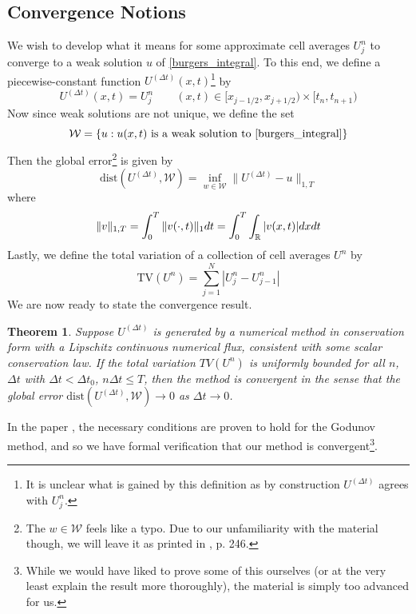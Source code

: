\documentclass{myproject}
\newtheorem{theorem}{Theorem}
\begin{document}
\subsection{Convergence Notions}

We wish to develop what it means for some approximate cell averages $U_j^n$ to converge to a weak solution $u$ of \eqref{burgers_integral}. To this end, we define a piecewise-constant function $U^{(\Delta t)}(x,t)$\footnote{It is unclear what is gained by this definition as by construction $U^{(\Delta t)}$ agrees with $U_j^n$.} by
\begin{equation}
    U^{(\Delta t)}(x,t) = U_j^n \qquad (x,t) \in [x_{j-1/2}, x_{j+1/2}) \times [t_n, t_{n+1})
\end{equation}
Now since weak solutions are not unique, we define the set
\begin{equation}
    \mathcal{W} = \{u : u(x,t) \text{ is a weak solution to \eqref{burgers_integral}}\}
\end{equation}
Then the global error\footnote{The $w \in \mathcal{W}$ feels like a typo. Due to our unfamiliarity with the material though, we will leave it as printed in \cite{leveque2002}, p. 246.} is given by
\begin{equation}
    \text{dist}\left(U^{(\Delta t)}, \mathcal{W}\right) = \inf_{w \in \mathcal{W}} \| U^{(\Delta t)} - u \|_{1,T}
\end{equation}
where 
\begin{equation}
    \|v\|_{1,T} = \int_{0}^{T} \|v(\cdot,t)\|_1dt = \int_{0}^{T}\int_{\operatorname{\mathbb{R}}}|v(x,t)|dx dt
\end{equation}
Lastly, we define the total variation of a collection of cell averages $U^n$ by 
\begin{equation}
    \text{TV}(U^n) = \sum_{j=1}^N |U_j^n - U_{j-1}^n|
\end{equation}
We are now ready to state the convergence result.
\begin{theorem}
    Suppose $U^{(\Delta t)}$ is generated by a numerical method in conservation form with a Lipschitz continuous numerical flux, consistent with some scalar conservation law. If the total variation $TV(U^n)$ is uniformly bounded for all $n$, $\Delta t$ with $\Delta t < \Delta t_0$, $n \Delta t \leq T$, then the method is convergent in the sense that the global error $\text{dist}\left(U^{(\Delta t)}, \mathcal{W}\right) \to 0$ as $\Delta t \to 0$.
\end{theorem}
In the paper \cite{leveque1985}, the necessary conditions are proven to hold for the Godunov method, and so we have formal verification that our method is convergent\footnote{While we would have liked to prove some of this ourselves (or at the very least explain the result more thoroughly), the material is simply too advanced for us.}. 
\end{document}
